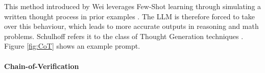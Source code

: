 This method introduced by Wei leverages Few-Shot learning through simulating a written thought process in prior examples \cite{Wei.28.01.2022}. The LLM is therefore forced to take over this behaviour, which leads to more accurate outputs in reasoning and math problems. Schulhoff refers it to the class of Thought Generation techniques \cite{Schulhoff.06.06.2024}. Figure \ref{fig:CoT} shows an example prompt.

\paragraph{Chain-of-Verification}
